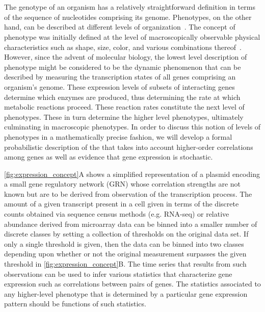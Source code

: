 
\section{\gnpm{}}
The genotype of an organism has a relatively straightforward definition in terms of the sequence of nucleotides comprising its genome. Phenotypes, on the other hand, can be described at different levels of organization~\cite{Dawkins1982,Stadler2001}. The concept of phenotype was initially defined at the level of macroscopically observable physical characteristics such as shape, size, color, and various combinations thereof~\cite{Johannsen1911}. However, since the advent of molecular biology, the lowest level description of phenotype might be considered to be the dynamic phenomenon that can be described by measuring the transcription states of all genes comprising an organism's genome.  These expression levels of subsets of interacting genes determine which enzymes are produced, thus determining the rate at which metabolic reactions proceed.  These reaction rates constitute the next level of phenotypes.  These in turn determine the higher level phenotypes, ultimately culminating in macroscopic phenotypes.  In order to discuss this notion of levels of phenotypes in a mathematically precise fashion, we will develop a formal probabilistic description of the \gnpm{} that takes into account higher-order correlations among genes as well as evidence that gene expression is stochastic.

\ref{fig:expression_concept}A shows a simplified representation of a plasmid encoding a small gene regulatory network (GRN) whose correlation strengths are not known but are to be derived from observation of the transcription process. The amount of a given transcript present in a cell given in terms of the discrete counts obtained via sequence census methods (e.g. RNA-seq) or relative abundance derived from microarray data can be binned into a smaller number of discrete classes by setting a collection of thresholds on the original data set. If only a single threshold is given, then the data can be binned into two classes depending upon whether or not the original measurement surpasses the given threshold in \ref{fig:expression_concept}B.
The time series that results from such observations can be used to infer various statistics that characterize gene expression such as correlations between pairs of genes. The statistics associated to any higher-level phenotype that is determined by a particular gene expression pattern should be functions of such statistics.

